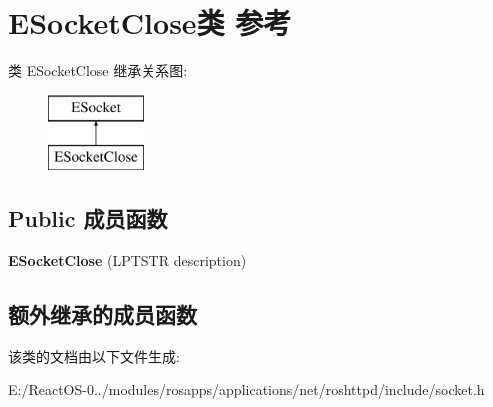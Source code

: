 \hypertarget{class_e_socket_close}{}\section{E\+Socket\+Close类 参考}
\label{class_e_socket_close}
类 E\+Socket\+Close 继承关系图\+:\begin{figure}[H]
\begin{center}
\leavevmode
\includegraphics[height=2.000000cm]{class_e_socket_close}
\end{center}
\end{figure}
\subsection*{Public 成员函数}
\begin{DoxyCompactItemize}
\item 
\mbox{\label{class_e_socket_close_a0d3cd85eebb369e342a024524af245a7}} 
{\bfseries E\+Socket\+Close} (L\+P\+T\+S\+TR description)
\end{DoxyCompactItemize}
\subsection*{额外继承的成员函数}


该类的文档由以下文件生成\+:\begin{DoxyCompactItemize}
\item 
E\+:/\+React\+O\+S-\/0../modules/rosapps/applications/net/roshttpd/include/socket.\+h\end{DoxyCompactItemize}
